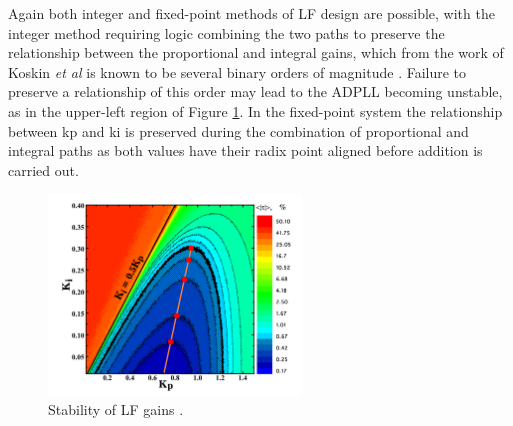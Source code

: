Again both integer and fixed-point methods of \ac{LF} design are possible, with the integer method requiring logic combining the two paths to preserve the relationship between the proportional and integral gains, which from the work of Koskin \textit{et al} is known to be several binary orders of magnitude \cite{koskin2018generation}. Failure to preserve a relationship of this order may lead to the \ac{ADPLL} becoming unstable, as in the upper-left region of Figure \ref{fig:gain_grid}. In the fixed-point system the relationship between \ac{kp} and \ac{ki} is preserved during the combination of proportional and integral paths as both values have their radix point aligned before addition is carried out.
\begin{figure}[h]
	\centering
	\includegraphics[width=0.6\textwidth]{../eugene}
	\caption[Stability of \acl{LF} gains]{Stability of \acl{LF} gains \cite{koskin2018generation}.}
	\label{fig:gain_grid}
\end{figure}